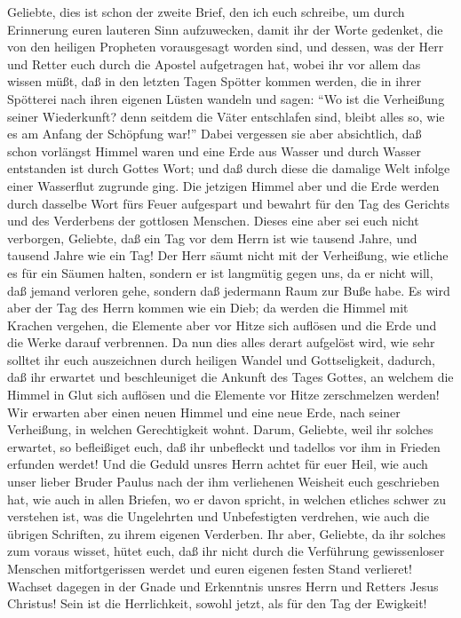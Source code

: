  Geliebte, dies ist schon der zweite Brief, den ich euch
schreibe, um durch Erinnerung euren lauteren Sinn aufzuwecken,
 damit ihr der Worte gedenket, die von den heiligen
Propheten vorausgesagt worden sind, und dessen, was der Herr und Retter
euch durch die Apostel aufgetragen hat,  wobei ihr vor
allem das wissen müßt, daß in den letzten Tagen Spötter kommen werden,
die in ihrer Spötterei nach ihren eigenen Lüsten wandeln und sagen:
 ``Wo ist die Verheißung seiner Wiederkunft? denn seitdem
die Väter entschlafen sind, bleibt alles so, wie es am Anfang der
Schöpfung war!''  Dabei vergessen sie aber absichtlich,
daß schon vorlängst Himmel waren und eine Erde aus Wasser und durch
Wasser entstanden ist durch Gottes Wort;  und daß durch
diese die damalige Welt infolge einer Wasserflut zugrunde ging.
 Die jetzigen Himmel aber und die Erde werden durch
dasselbe Wort fürs Feuer aufgespart und bewahrt für den Tag des Gerichts
und des Verderbens der gottlosen Menschen.  Dieses eine
aber sei euch nicht verborgen, Geliebte, daß ein Tag vor dem Herrn ist
wie tausend Jahre, und tausend Jahre wie ein Tag!  Der
Herr säumt nicht mit der Verheißung, wie etliche es für ein Säumen
halten, sondern er ist langmütig gegen uns, da er nicht will, daß jemand
verloren gehe, sondern daß jedermann Raum zur Buße habe. 
Es wird aber der Tag des Herrn kommen wie ein Dieb; da werden die Himmel
mit Krachen vergehen, die Elemente aber vor Hitze sich auflösen und die
Erde und die Werke darauf verbrennen.  Da nun dies alles
derart aufgelöst wird, wie sehr solltet ihr euch auszeichnen durch
heiligen Wandel und Gottseligkeit,  dadurch, daß ihr
erwartet und beschleuniget die Ankunft des Tages Gottes, an welchem die
Himmel in Glut sich auflösen und die Elemente vor Hitze zerschmelzen
werden!  Wir erwarten aber einen neuen Himmel und eine
neue Erde, nach seiner Verheißung, in welchen Gerechtigkeit wohnt.
 Darum, Geliebte, weil ihr solches erwartet, so
befleißiget euch, daß ihr unbefleckt und tadellos vor ihm in Frieden
erfunden werdet!  Und die Geduld unsres Herrn achtet für
euer Heil, wie auch unser lieber Bruder Paulus nach der ihm verliehenen
Weisheit euch geschrieben hat,  wie auch in allen
Briefen, wo er davon spricht, in welchen etliches schwer zu verstehen
ist, was die Ungelehrten und Unbefestigten verdrehen, wie auch die
übrigen Schriften, zu ihrem eigenen Verderben.  Ihr aber,
Geliebte, da ihr solches zum voraus wisset, hütet euch, daß ihr nicht
durch die Verführung gewissenloser Menschen mitfortgerissen werdet und
euren eigenen festen Stand verlieret!  Wachset dagegen in
der Gnade und Erkenntnis unsres Herrn und Retters Jesus Christus! Sein
ist die Herrlichkeit, sowohl jetzt, als für den Tag der Ewigkeit!
